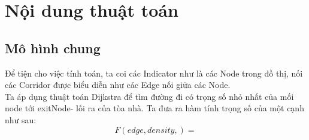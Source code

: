 \section{Nội dung thuật toán}
    \subsection{Mô hình chung}
    Để tiện cho việc tính toán, ta coi các Indicator như là các Node 
    trong đồ thị, nối các Corridor được biểu diễn như các Edge nối giữa
    các Node. \\ 
    Ta áp dụng thuật toán Dijkstra để tìm đường đi có trọng số nhỏ nhất 
    của mối node tới exitNode- lối ra của tòa nhà. Ta đưa ra hàm tính 
    trọng số của một cạnh như sau: 
    \begin{equation}
        F(edge, density,) =        
    \end{equation}

